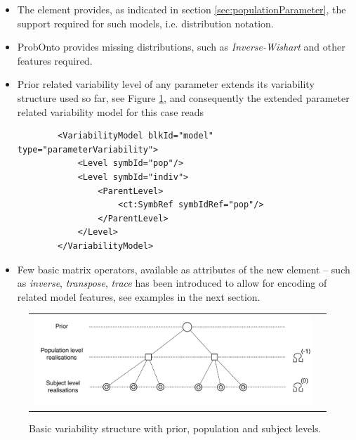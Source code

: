 \begin{itemize}
\item 
The  element provides, as indicated in section 
\ref{sec:populationParameter}, the support required for such models, i.e.
distribution notation.
\item 
ProbOnto provides missing distributions, such as \emph{Inverse-Wishart} 
and other features required. 
\item 
Prior related variability level of any parameter extends its variability 
structure used so far, see Figure \ref{fig:priorVM1}, and 
consequently the extended parameter related variability model for this 
case reads
\lstset{language=XML}
\begin{lstlisting}
        <VariabilityModel blkId="model" type="parameterVariability">
            <Level symbId="pop"/>
            <Level symbId="indiv">
                <ParentLevel>
                    <ct:SymbRef symbIdRef="pop"/>
                </ParentLevel>
            </Level>
        </VariabilityModel>
\end{lstlisting}
\item 
Few basic matrix operators, available as attributes of the new  element 
-- such as \emph{inverse},  \emph{transpose}, \emph{trace} has been introduced to 
allow for encoding of related model features, see examples in the next section.
\end{itemize}


\begin{figure}[htb!]
\centering
\begin{tabular}{cc}
 \includegraphics[width=140mm]{pics/IOV0-prior}
\end{tabular}
\caption{Basic variability structure with prior, population and subject levels.}
\label{fig:priorVM1}
\end{figure}


